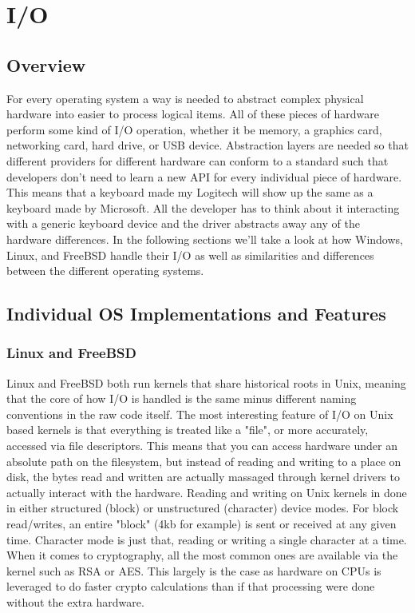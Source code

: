 \section{I/O}
\subsection{Overview}
For every operating system a way is needed to abstract complex physical hardware into easier to process logical items. All of these pieces of hardware perform some kind of I/O operation, whether it be memory, a graphics card, networking card, hard drive, or USB device. Abstraction layers are needed so that different providers for different hardware can conform to a standard such that developers don't need to learn a new API for every individual piece of hardware. This means that a keyboard made my Logitech will show up the same as a keyboard made by Microsoft. All the developer has to think about it interacting with a generic keyboard device and the driver abstracts away any of the hardware differences. In the following sections we'll take a look at how Windows, Linux, and FreeBSD handle their I/O as well as similarities and differences between the different operating systems. 

\subsection{Individual OS Implementations and Features}
\subsubsection{Linux and FreeBSD}
Linux and FreeBSD both run kernels that share historical roots in Unix, meaning that the core of how I/O is handled is the same minus different naming conventions in the raw code itself. The most interesting feature of I/O on Unix based kernels is that everything is treated like a "file", or more accurately, accessed via file descriptors. This means that you can access hardware under an absolute path on the filesystem, but instead of reading and writing to a place on disk, the bytes read and written are actually massaged through kernel drivers to actually interact with the hardware. Reading and writing on Unix kernels in done in either structured (block) or unstructured (character) device modes. For block read/writes, an entire "block" (4kb for example) is sent or received at any given time. Character mode is just that, reading or writing a single character at a time. When it comes to cryptography, all the most common ones are available via the kernel such as RSA or AES. This largely is the case as hardware on CPUs is leveraged to do faster crypto calculations than if that processing were done without the extra hardware.

